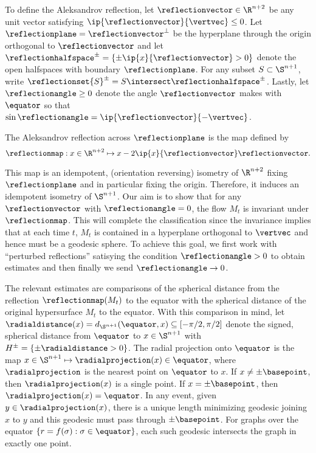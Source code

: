 \documentclass[12pt]{amsart}
\begin{document}
To define the Aleksandrov reflection, let \(\reflectionvector \in \R^{n+2}\) be any unit vector satisfying \(\ip{\reflectionvector}{\vertvec} \leq 0\). Let \(\reflectionplane = \reflectionvector^{\perp}\) be the hyperplane through the origin orthogonal to \(\reflectionvector\) and let \(\reflectionhalfspace^{\pm} = \{\pm \ip{x}{\reflectionvector} > 0\}\) denote the open halfspaces with boundary \(\reflectionplane\). For any subset \(S \subset \S^{n+1}\), write \(\reflectionset{S}^{\pm} = S \intersect \reflectionhalfspace^{\pm}\). Lastly, let \(\reflectionangle \geq 0\) denote the angle \(\reflectionvector\) makes with \(\equator\) so that \(\sin \reflectionangle = \ip{\reflectionvector}{-\vertvec}\).

\begin{definition}
The Aleksandrov reflection across \(\reflectionplane\) is the map defined by
\[
\reflectionmap: x \in \R^{n+2} \mapsto x - 2\ip{x}{\reflectionvector} \reflectionvector.
\]
\end{definition}

This map is an idempotent, (orientation reversing) isometry of \(\R^{n+2}\) fixing \(\reflectionplane\) and in particular fixing the origin. Therefore, it induces an idempotent isometry of \(\S^{n+1}\). Our aim is to show that for any \(\reflectionvector\) with \(\reflectionangle = 0\), the flow \(M_t\) is invariant under \(\reflectionmap\). This will complete the classification since the invariance implies that at each time \(t\), \(M_t\) is contained in a hyperplane orthogonal to \(\vertvec\) and hence must be a geodesic sphere. To achieve this goal, we first work with ``perturbed reflections'' satisying the condition \(\reflectionangle > 0\) to obtain estimates and then finally we send \(\reflectionangle \to 0\). 

The relevant estimates are comparisons of the spherical distance from the reflection \(\reflectionmap(M_t)\) to the equator with the spherical distance of the original hypersurface \(M_t\) to the equator. With this comparison in mind, let \(\radialdistance(x) = d_{\S^{n+1}} (\equator, x) \subseteq [-\pi/2,\pi/2]\) denote the signed, spherical distance from \(\equator\) to \(x \in \S^{n+1}\) with \(H^{\pm} = \{\pm \radialdistance > 0\}\). The radial projection onto \(\equator\) is the map \(x \in \S^{n+1} \mapsto \radialprojection(x) \in \equator\), where \(\radialprojection\) is the nearest point on \(\equator\) to \(x\). If \(x \ne \pm \basepoint\), then \(\radialprojection(x)\) is a single point. If \(x = \pm \basepoint\), then \(\radialprojection(x) = \equator\). In any event, given \(y \in \radialprojection(x)\), there is a unique length minimizing geodesic joining \(x\) to \(y\) and this geodesic must pass through \(\pm \basepoint\). For graphs over the equator \(\{r = f(\sigma) : \sigma \in \equator\}\), each such geodesic intersects the graph in exactly one point.
\end{document}
